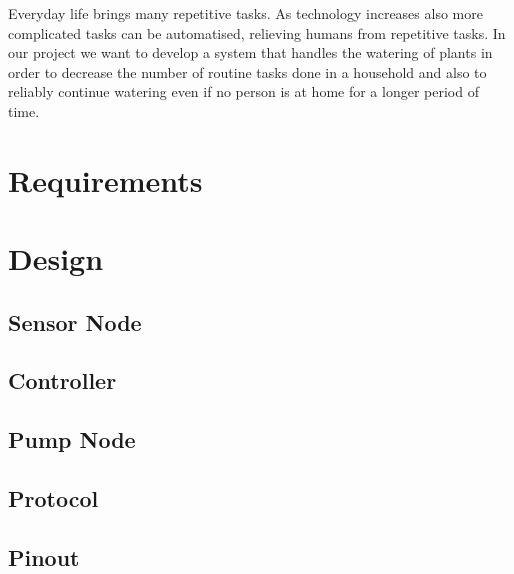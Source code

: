 \documentclass[12pt,a4paper,titlepage,oneside]{article}
\begin{document}
\maketitle



 
 
Everyday life brings many repetitive tasks. As technology increases also more complicated tasks can be automatised, relieving humans from repetitive tasks. In our project we want to develop a system that handles the watering of plants in order to decrease the number of routine tasks done in a household and also to reliably continue watering even if no person is at home for a longer period of time.

\section{Requirements}



\section{Design}

\subsection{Sensor Node}


\subsection{Controller}


\subsection{Pump Node}


\subsection{Protocol}


\subsection{Pinout}





\clearpage 
{}
{}


\printindex
\printindex
\end{document}

